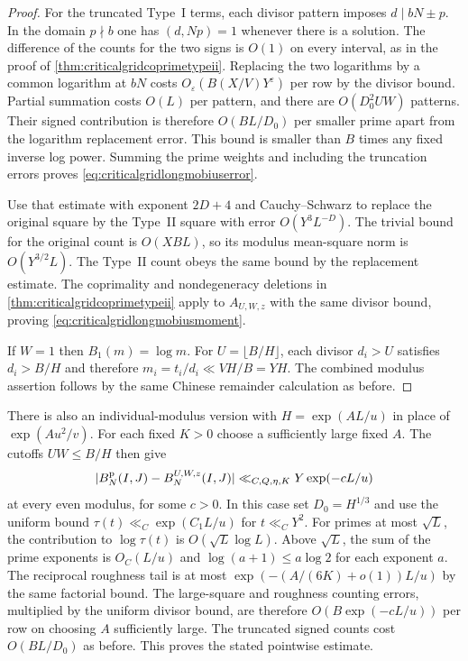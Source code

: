 \documentclass[11pt,a4paper]{article}
\numberwithin{equation}{section}
\begin{document}
\begin{proof}
For the truncated Type~I terms, each divisor pattern
imposes $d\mid bN\pm p$. In the domain $p\nmid b$ one
has $(d,Np)=1$ whenever there is a solution.
The difference of the counts for the two signs is
$O(1)$ on every interval, as in the proof of
\cref{thm:criticalgridcoprimetypeii}. Replacing the
two logarithms by a common logarithm at $bN$
costs $O_\varepsilon(B(X/V)Y^\varepsilon)$ per
row by the divisor bound. Partial summation costs
$O(L)$ per pattern, and there are $O(D_0^2 UW)$
patterns. Their signed contribution is therefore
$O(BL/D_0)$ per smaller prime apart from the
logarithm replacement error. This bound is smaller
than $B$ times any fixed inverse log power.
Summing the prime weights and including the
truncation errors proves \cref{eq:criticalgridlongmobiuserror}.

Use that estimate with exponent $2D+4$ and
Cauchy--Schwarz to replace the original square
by the Type~II square with error $O(Y^3 L^{-D})$.
The trivial bound for the original count is
$O(XBL)$, so its modulus mean-square norm is
$O(Y^{3/2}L)$. The Type~II count obeys the same
bound by the replacement estimate.
The coprimality and nondegeneracy deletions in
\cref{thm:criticalgridcoprimetypeii} apply to
$A_{U,W,z}$ with the same divisor bound, proving
\cref{eq:criticalgridlongmobiusmoment}.

If $W=1$ then $B_1(m)=\log m$. For
$U=\lfloor B/H\rfloor$, each divisor $d_i>U$
satisfies $d_i>B/H$ and therefore
$m_i=t_i/d_i\ll V H/B=YH$. The combined modulus
assertion follows by the same Chinese remainder
calculation as before.
\end{proof}

There is also an individual-modulus version with
$H=\exp(A L/u)$ in place of $\exp(Au^2/v)$.
For each fixed $K>0$ choose a sufficiently large
fixed $A$. The cutoffs $UW\le B/H$ then give
\[
 |B_N^{\rm p}(I,J)-B_N^{U,W,z}(I,J)|
    \ll_{C,Q,\eta,K}Y\exp(-cL/u)
\]
at every even modulus, for some $c>0$. In this
case set $D_0=H^{1/3}$ and use the uniform bound
$\tau(t)\ll_C\exp(C_1 L/u)$ for $t\ll_C Y^2$.
For primes at most $\sqrt L$, the contribution
to $\log\tau(t)$ is $O(\sqrt L\log L)$. Above
$\sqrt L$, the sum of the prime exponents is
$O_C(L/u)$ and $\log(a+1)\le a\log 2$ for each
exponent $a$. The reciprocal roughness tail is
at most $\exp(-(A/(6K)+o(1))L/u)$ by the same factorial
bound. The large-square and roughness counting
errors, multiplied by the uniform divisor bound,
are therefore $O(B\exp(-cL/u))$ per row on
choosing $A$ sufficiently large. The truncated
signed counts cost $O(BL/D_0)$ as before. This
proves the stated pointwise estimate.
\end{document}
